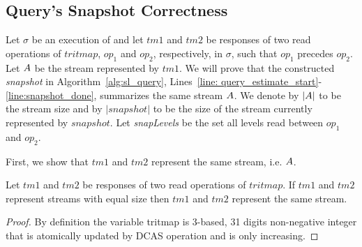 
\subsection{Query's Snapshot Correctness}
Let $\sigma$ be an execution of \mysketch and let $tm1$ and $tm2$ be responses of two read operations of $tritmap$, $op_1$ and $op_2$, respectively, in $\sigma$, such that $op_1$ precedes $op_2$. Let $\mathnormal{A}$ be the stream represented by $tm1$. We will prove that the constructed \emph{snapshot} in Algorithm~\ref{alg:sl_query}, Lines~\ref{line: query_estimate_start}-\ref{line:snapshot_done}, summarizes the same stream $\mathnormal{A}$. We denote by $|\mathnormal{A}|$ to be the stream size and by $|snapshot|$ to be the size of the stream currently represented by $snapshot$.
Let \emph{snapLevels} be the set all levels read between $op_1$ and $op_2$.

First, we show that $tm1$ and $tm2$ represent the same stream, i.e.  $\mathnormal{A}$.

\begin{lemma}
Let $tm1$ and $tm2$ be responses of two read operations of $tritmap$.
If $tm1$ and $tm2$ represent streams with equal size then $tm1$ and $tm2$ represent the same stream.
\end{lemma}
\begin{proof}
By definition the variable tritmap is 3-based, 31 digits non-negative integer that is atomically updated by DCAS operation and is only increasing.   
\end{proof}

